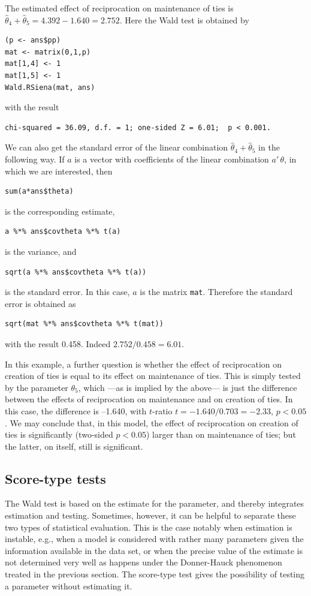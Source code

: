 \documentclass[a4paper,fleqn,11pt]{article}
\newcommand{\+}{\, + \,}
\begin{document}
The estimated effect of reciprocation on maintenance of ties is
$\hat\theta_4 + \hat\theta_5 = 4.392 - 1.640 = 2.752$.
Here the Wald test is obtained by
\begin{verbatim}
(p <- ans$pp)
mat <- matrix(0,1,p)
mat[1,4] <- 1
mat[1,5] <- 1
Wald.RSiena(mat, ans)
\end{verbatim}
with the result
\begin{verbatim}
chi-squared = 36.09, d.f. = 1; one-sided Z = 6.01;  p < 0.001.
\end{verbatim}

We can also get the standard error of the linear combination
$\hat\theta_4 + \hat\theta_5$ in the following way.
If $a$ is a vector with coefficients of the linear combination
$a'\,\theta$, in which we are interested, then
\begin{verbatim}
sum(a*ans$theta)
\end{verbatim}
 is the corresponding estimate,
\begin{verbatim}
a %*% ans$covtheta %*% t(a)
\end{verbatim}
is the variance, and
\begin{verbatim}
sqrt(a %*% ans$covtheta %*% t(a))
\end{verbatim}
is the standard error.
In this case, $a$ is the matrix \texttt{mat}.
Therefore the standard error is obtained as
\begin{verbatim}
sqrt(mat %*% ans$covtheta %*% t(mat))
\end{verbatim}
with the result 0.458.
Indeed $2.752 / 0.458 = 6.01$.

In this example, a further question is whether the effect of reciprocation
on creation of ties is equal to its effect on maintenance of ties.
This is simply tested by the parameter $\theta_5$, which ---as is implied
by the above--- is just the difference between the effects of reciprocation
on maintenance and on creation of ties. In this case, the difference is --1.640,
with $t$-ratio $t = -1.640/0.703 = -2.33$, $p < 0.05$.
We may conclude that, in this model, the effect of reciprocation on
creation of ties is significantly (two-sided $p < 0.05$) larger than
on maintenance of ties; but the latter, on itself,
still is significant.


\subsection{Score-type tests}
\label{S_Scoretest}

The Wald test is based on the estimate for the parameter,
and thereby integrates estimation and testing.
Sometimes, however, it can be helpful to separate these two
types of statistical evaluation.
This is the case notably when estimation is instable, e.g.,
when a model is considered with rather many parameters given
the information available in the data set,
or when the precise value of the estimate is not determined
very well as happens under the Donner-Hauck phenomenon
treated in the previous section.
The score-type test gives the possibility of testing
a parameter without estimating it.
\end{document}
